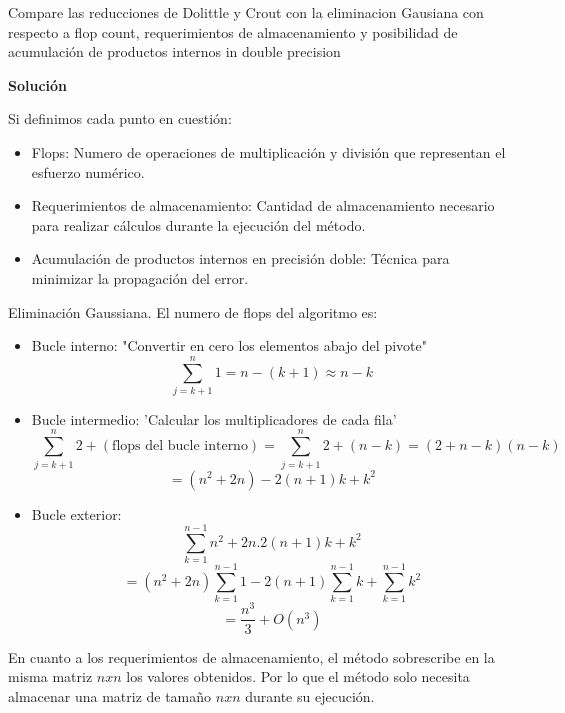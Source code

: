Compare las reducciones de Dolittle y Crout con la eliminacion Gausiana con respecto a flop count, requerimientos de almacenamiento y posibilidad de acumulación de productos internos in double precision

\textbf{Solución}

Si definimos cada punto en cuestión:
\begin{itemize}
    \item Flops: Numero de operaciones de multiplicación y división que representan el esfuerzo numérico.
    \item Requerimientos de almacenamiento: Cantidad de almacenamiento necesario para realizar cálculos durante la ejecución del método.
    \item Acumulación de productos internos en precisión doble: Técnica para minimizar la propagación del error.
\end{itemize}

Eliminación Gaussiana.
El numero de flops del algoritmo es:
\begin{itemize}
    \item Bucle interno: "Convertir en cero los elementos abajo del pivote"
    $$\sum_{j=k+1}^{n}1=n-(k+1)\approx n-k$$
    \item Bucle intermedio: 'Calcular los multiplicadores de cada fila'
    $$\sum_{j=k+1}^{n}2+( \text{flops del bucle interno})=\sum_{j=k+1}^{n}2+(n-k)= (2+n-k)(n-k)$$
    $$=(n^2+2n)-2(n+1)k+k^2$$
    \item Bucle exterior: 
    $$\sum_{k=1}^{n-1}n^2+2n.2(n+1)k+k^2$$
    $$=(n^2+2n)\sum_{k=1}^{n-1}1-2(n+1)\sum_{k=1}^{n-1}k+\sum_{k=1}^{n-1}k^2$$
    $$=\frac{n^3}{3} + O(n^3)$$
\end{itemize}
En cuanto a los requerimientos de almacenamiento, el método sobrescribe en la misma matriz $nxn$ los valores obtenidos. Por lo que el método solo necesita almacenar una matriz de tamaño $nxn$ durante su ejecución.

